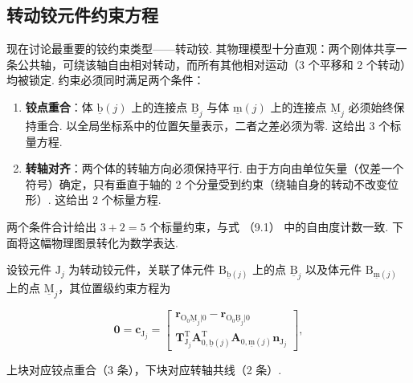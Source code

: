 \subsection{转动铰元件约束方程}
现在讨论最重要的铰约束类型——转动铰. 其物理模型十分直观：两个刚体共享一条公共轴，可绕该轴自由相对转动，而所有其他相对运动（3 个平移和 2 个转动）均被锁定. 约束必须同时满足两个条件：
\begin{enumerate}

\item \textbf{铰点重合}：体 $\underline{\text{b}}(j)$ 上的连接点 $\underline{\text{B}}_j$ 与体 $\underline{\text{m}}(j)$ 上的连接点 $\underline{\text{M}}_j$ 必须始终保持重合. 以全局坐标系中的位置矢量表示，二者之差必须为零. 这给出 $3$ 个标量方程.

\item \textbf{转轴对齐}：两个体的转轴方向必须保持平行. 由于方向由单位矢量（仅差一个符号）确定，只有垂直于轴的 2 个分量受到约束（绕轴自身的转动不改变位形）. 这给出 $2$ 个标量方程.

\end{enumerate}
两个条件合计给出 $3 + 2 = 5$ 个标量约束，与式 （9.1） 中的自由度计数一致. 下面将这幅物理图景转化为数学表达.
\begin{theorem}[定理 9.5（转动铰元件的位置级约束方程）]
设铰元件 $\text{J}_j$ 为转动铰元件，关联了体元件 $\text{B}_{\underline{\text{b}}(j)}$ 上的点 $\underline{\text{B}}_j$ 以及体元件 $\text{B}_{\underline{\text{m}}(j)}$ 上的点 $\underline{\text{M}}_j$，其位置级约束方程为

\[
\boldsymbol{0} = \boldsymbol{c}_{\text{J}_j} = \begin{bmatrix} \boldsymbol{r}_{\text{O}_0\underline{\text{M}}_j|0} - \boldsymbol{r}_{\text{O}_0\underline{\text{B}}_j|0} \\
\boldsymbol{T}_{\text{J}_j}^\text{T} \boldsymbol{A}_{0,\underline{\text{b}}(j)}^\text{T} \boldsymbol{A}_{0,\underline{\text{m}}(j)} \boldsymbol{n}_{\text{J}_j} \end{bmatrix},
\]

上块对应铰点重合（3 条），下块对应转轴共线（2 条）.
\end{theorem}
